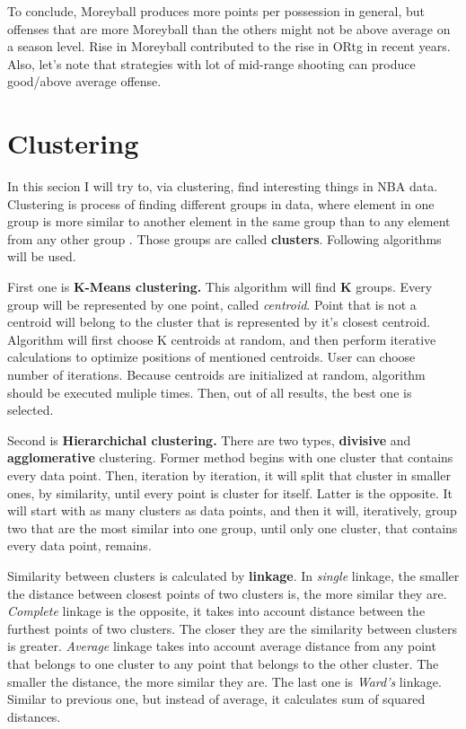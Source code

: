 \documentclass[a4paper]{article}
\begin{document}
To conclude, Moreyball produces more points per possession in general, but offenses that are more Moreyball than the others might not be above average on a season level. Rise in Moreyball contributed to the rise in ORtg in recent years. Also, let's note that strategies with lot of mid-range shooting can produce good/above average offense. %


\section{Clustering}
\label{sec:clustering}

In this secion I will try to, via clustering, find interesting things in NBA data. Clustering is process of finding different groups in data, where element in one group is more similar to another element in the same group than to any element from any other group \cite{clustering}. Those groups are called \textbf{clusters}. Following algorithms will be used.

First one is \textbf{K-Means clustering.} This algorithm will find \textbf{K} groups. Every group will be represented by one point, called \textit{centroid}. Point that is not a centroid will belong to the cluster that is represented by it's closest centroid. Algorithm will first choose K centroids at random, and then perform iterative calculations to optimize positions of mentioned centroids. User can choose number of iterations. Because centroids are initialized at random, algorithm should be executed muliple times. Then, out of all results, the best one is selected. \cite{clustering}

Second is \textbf{Hierarchichal clustering.} There are two types, \textbf{divisive} and \textbf{agglomerative} clustering. Former method begins with one cluster that contains every data point. Then, iteration by iteration, it will split that cluster in smaller ones, by similarity, until every point is cluster for itself. Latter is the opposite. It will start with as many clusters as data points, and then it will, iteratively, group two that are the most similar into one group, until only one cluster, that contains every data point, remains. \cite{clustering}

Similarity between clusters is calculated by \textbf{linkage}. In \textit{single} linkage, the smaller the distance between closest points of two clusters is, the more similar they are. \textit{Complete} linkage is the opposite, it takes into account distance between the furthest points of two clusters. The closer they are the similarity between clusters is greater. \textit{Average} linkage takes into account average distance from any point that belongs to one cluster to any point that belongs to the other cluster. The smaller the distance, the more similar they are. The last one is \textit{Ward's} linkage. Similar to previous one, but instead of average, it calculates sum of squared distances. \cite{clustering}\cite{hierarchical}
\end{document}
